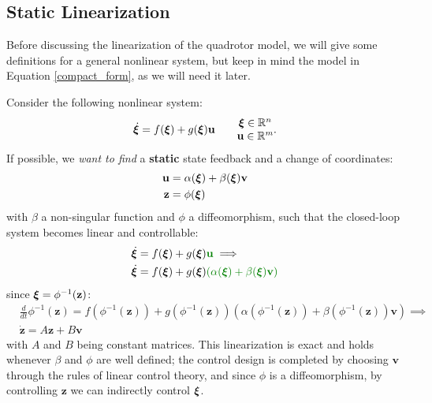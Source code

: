 \documentclass[10pt, a4paper]{report}
\begin{document}
\subsection{Static Linearization}
Before discussing the linearization of the quadrotor model, we will give some definitions for a general nonlinear system, but keep in mind the model in Equation \eqref{compact_form}, as we will need it later.\bigskip 

\noindent Consider the following nonlinear system:\begin{equation}
    \dot{{\boldsymbol{\xi}}}=f({\boldsymbol{\xi}})+g({\boldsymbol{\xi}})\mathbf u\quad\quad\begin{matrix}{\boldsymbol{\xi}}\in{\mathbb R}^n\\\mathbf u \in {\mathbb R}^m\end{matrix}.
\end{equation}
If possible, we \textit{want to find} a \textbf{static} state feedback and a change of coordinates:\begin{align}
    \mathbf u&=\alpha({\boldsymbol{\xi}})+\beta({\boldsymbol{\xi}})\mathbf v\\ \mathbf z&=\phi({\boldsymbol{\xi}})
\end{align}
with $\beta$ a non-singular function and $\phi$ a diffeomorphism, such that the closed-loop system becomes linear and controllable:\begin{align}
    &\dot\bxi=f(\bxi)+g(\bxi)\greenText{\mathbf u}\implies \\
    &\dot\bxi=f(\bxi)+g(\bxi)\greenText{(\alpha(\bxi)+\beta(\bxi)\mathbf v)} \end{align}
    since ${\boldsymbol{\xi}}=\phi^{-1}(\mathbf z)$:
    \begin{align}
    &\frac{d}{dt}\phi^{-1}(\mathbf z)=f(\phi^{-1}(\mathbf z))+g(\phi^{-1}(\mathbf z))(\alpha(\phi^{-1}(\mathbf z))+\beta({\phi^{-1}(\mathbf z)})\mathbf v)\implies \\ 
    &\dot {\mathbf z}=A\mathbf z+B\mathbf v 
\end{align} 
with $A$ and $B$ being constant matrices. This linearization is exact and holds whenever $\beta$ and $\phi$ are well defined; the control design is completed by choosing $\mathbf v$ through the rules of linear control theory, and since $\phi$ is a diffeomorphism, by controlling $\mathbf z$ we can indirectly control ${\boldsymbol{\xi}}$.
\end{document}
